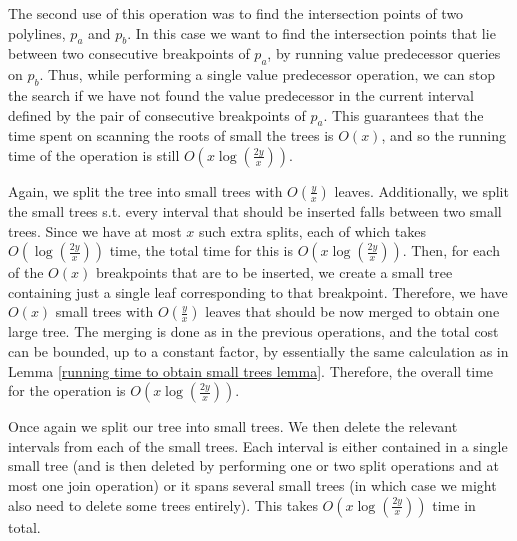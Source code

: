 \documentclass[11pt,a4paper]{article}
\theoremstyle{definition}
\theoremstyle{remark}
\begin{document}
The second use of this operation was to find the intersection points of two polylines, $p_a$ and $p_b$. In this case we want to find the intersection points that lie between two consecutive breakpoints of $p_a$, by running value predecessor queries on $p_b$. Thus, while performing a single value predecessor operation, we can stop the search if we have not found the value predecessor in the current interval defined by the pair of consecutive breakpoints of $p_a$. This guarantees that the time spent on scanning the roots of small the trees is $O(x)$, and so the running time of the operation is still $O(x \log (\frac{2y}{x}))$.


\vspace{0.04in} 
Again, we split the tree into small trees with $O(\frac{y}{x})$ leaves. Additionally, we split the small trees s.t. every interval
that should be inserted falls between two small trees.
Since we have at most $x$ such extra splits, each of which takes $O(\log(\frac{2y}{x}))$ time, the total time for this is $O(x\log(\frac{2y}{x}))$.
Then, for each of the $O(x)$ breakpoints that are to be inserted, we create a small tree containing just a single leaf corresponding to that
breakpoint. Therefore, we have $O(x)$ small trees with $O(\frac{y}{x})$ leaves that should be now merged
to obtain one large tree.
The merging is done as in the previous operations, and the total cost can be bounded,
up to a constant factor, by essentially the same calculation as in Lemma \ref{running time to obtain small trees lemma}. Therefore, the overall time for the operation is $O(x \log(\frac{2y}{x}))$.

\vspace{0.04in} 
Once again we split our tree into small trees. We then delete the relevant intervals from each of the small trees. Each interval is either contained in a single small tree (and is then deleted by performing one or two split operations and at most one join operation) or it spans several small trees (in which case we might also need to delete some trees entirely). This takes $O(x \log(\frac{2y}{x}))$ time in total.
\end{document}
